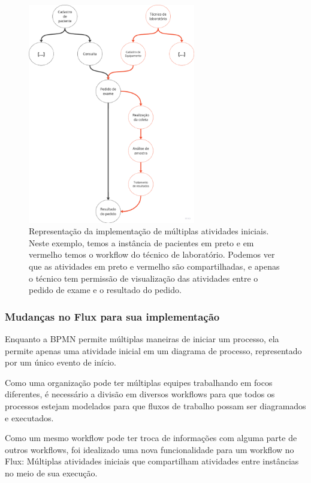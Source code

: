 \begin{figure}
    \centering
    \includegraphics[width=0.65\textwidth]{imgs/Exemplo/exemplo_pedido_exame.png}
    \caption{Representação da implementação de múltiplas atividades iniciais. Neste exemplo, temos a instância de pacientes em preto e em vermelho temos o workflow do técnico de laboratório. Podemos ver que as atividades em preto e vermelho são compartilhadas, e apenas o técnico tem permissão de visualização das atividades entre o pedido de exame e o resultado do pedido.}
    \label{fig:segunda_implementacao}
\end{figure}

\subsubsection{Mudanças no Flux para sua implementação}

Enquanto a BPMN permite múltiplas maneiras de iniciar um processo, ela permite apenas uma atividade inicial em um diagrama de processo, representado por um único evento de início.

Como uma organização pode ter múltiplas equipes trabalhando em focos diferentes, é necessário a divisão em diversos workflows para que todos os processos estejam modelados para que fluxos de trabalho possam ser diagramados e executados.

Como um mesmo workflow pode ter troca de informações com alguma parte de outros workflows, foi idealizado uma nova funcionalidade para um workflow no Flux: Múltiplas atividades iniciais que compartilham atividades entre instâncias no meio de sua execução.

